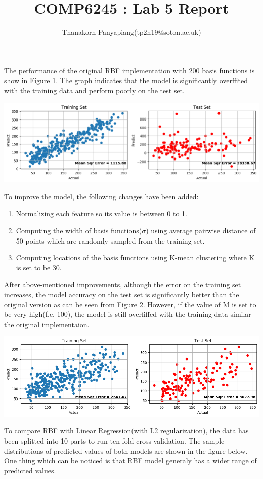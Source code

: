 \documentclass{article}
\title{COMP6245 : Lab 5 Report}
\author{Thanakorn Panyapiang(tp2n19@soton.ac.uk)}
\date{}
\begin{document}
\maketitle

The performance of the original RBF implementation with 200 basis functions is show in Figure 1. The graph indicates that the model is significantly overffited with the training data and perform poorly on the test set.

\includegraphics[scale=0.4]{rbf_original}

To improve the model, the following changes have been added:
\begin{enumerate}
\item Normalizing each feature so its value is between 0 to 1.
\item Computing the width of basis functions($\sigma$) using average pairwise distance of 50 points which are randomly sampled from the training set.
\item Computing locations of the basis functions using K-mean clustering where K is set to be 30.
\end{enumerate}

\indent After above-mentioned improvements, although the error on the training set increases, the model accuracy on the test set is significantly better than the original version as can be seen from Figure 2. However, if the value of M is set to be very high(f.e. 100), the model is still overfiffed with the training data similar the original implementaion.

\includegraphics[scale=0.4]{rbf_improved}

To compare RBF with Linear Regression(with L2 regularization), the data has been splitted into 10 parts to run ten-fold cross validation. The sample distributions of predicted values of both models are shown in the figure below. One thing which can be noticed is that RBF model generaly has a wider range of predicted values.
\end{document}
